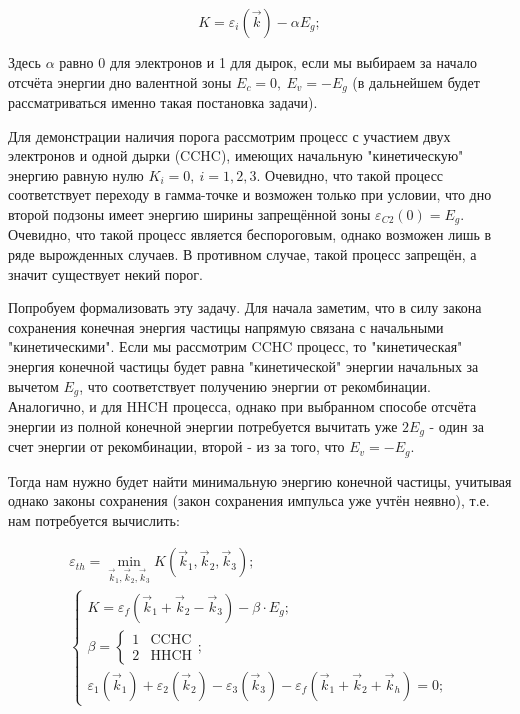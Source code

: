 \documentclass[../main.tex]{subfiles}
\begin{document}
    \begin{equation*}
        K = \varepsilon_i(\vec{k}) - \alpha E_g;
    \end{equation*}

    Здесь $\alpha$ равно 0 для электронов и 1 для дырок, если мы выбираем за 
    начало отсчёта энергии дно валентной зоны $E_c = 0,~E_v = -E_g$
    (в дальнейшем будет рассматриваться именно такая постановка задачи).

    Для демонстрации наличия порога рассмотрим процесс с участием двух 
    электронов и одной дырки (CCHC), имеющих начальную "кинетическую" энергию 
    равную нулю $K_i = 0,~i=1,2,3$. Очевидно, что такой процесс соответствует
    переходу в гамма-точке и возможен только при условии, что дно второй подзоны
    имеет энергию ширины запрещённой зоны $\varepsilon_{C2}(0) = E_g$. Очевидно,
    что такой процесс является беспороговым, однако возможен лишь в ряде
    вырожденных случаев. В противном случае, такой процесс запрещён, а значит 
    существует некий порог.

    Попробуем формализовать эту задачу. Для начала заметим, что в силу закона
    сохранения конечная энергия частицы напрямую связана с начальными "кинетическими".
    Если мы рассмотрим CCHC процесс, то "кинетическая" энергия конечной частицы
    будет равна "кинетической" энергии начальных за вычетом $E_g$, что соответствует
    получению энергии от рекомбинации. Аналогично, и для HHCH процесса, однако
    при выбранном способе отсчёта энергии из полной конечной энергии потребуется 
    вычитать уже $2E_g$ - один за счет энергии от рекомбинации, второй - из за того, 
    что $E_v = - E_g$.

    Тогда нам нужно будет найти минимальную энергию конечной частицы, учитывая
    однако законы сохранения (закон сохранения импульса уже учтён неявно), 
    т.е. нам потребуется вычислить: 

    \begin{equation}
        \begin{array}{l}
            \label{gfunc}
            \varepsilon_{th} = \min_{\vec{k}_1, \vec{k}_2, \vec{k}_3} K (\vec{k}_1, \vec{k}_2, \vec{k}_3);\\
            \begin{cases}
                K  = \varepsilon_f(\vec{k}_1 + \vec{k}_2 - \vec{k}_3) - \beta \cdot E_g;\\
                \beta = \begin{cases}
                            1   & \text{CCHC}\\
                            2   & \text{HHCH}
                        \end{cases};\\
                \varepsilon_1(\vec{k}_1) + \varepsilon_2(\vec{k}_2) - \varepsilon_3(\vec{k}_3) - \varepsilon_f(\vec{k}_1 + \vec{k}_2 + \vec{k}_h) = 0;
            \end{cases}
        \end{array}
    \end{equation}
\end{document}
